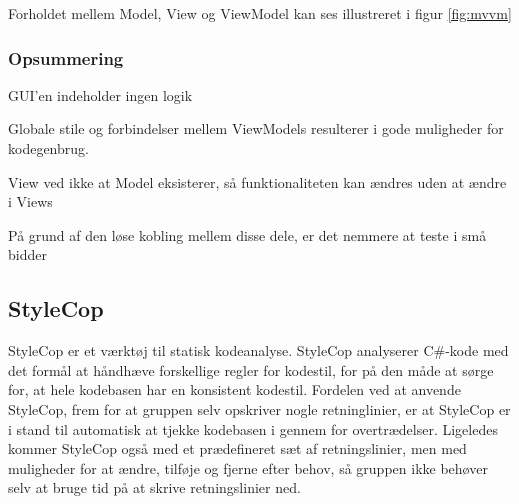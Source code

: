 Forholdet mellem Model, View og ViewModel kan ses illustreret i figur \ref{fig:mvvm}


\subsubsection*{Opsummering}

\begin{itemize_small}
    \item GUI'en indeholder ingen logik
    \item Globale stile og forbindelser mellem ViewModels resulterer i gode muligheder for kodegenbrug.
    \item View ved ikke at Model eksisterer, så funktionaliteten kan ændres uden at ændre i Views
    \item På grund af den løse kobling mellem disse dele, er det nemmere at teste i små bidder
\end{itemize_small}


\subsection*{StyleCop}
StyleCop\cite{StyleCop} er et værktøj til statisk kodeanalyse. StyleCop analyserer C\#-kode med det formål at håndhæve forskellige regler for kodestil, for på den måde at sørge for, at hele kodebasen har en konsistent kodestil. Fordelen ved at anvende StyleCop, frem for at gruppen selv opskriver nogle retninglinier, er at StyleCop er i stand til automatisk at tjekke kodebasen i gennem for overtrædelser. Ligeledes kommer StyleCop også med et prædefineret sæt af retningslinier, men med muligheder for at ændre, tilføje og fjerne efter behov, så gruppen ikke behøver selv at bruge tid på at skrive retningslinier ned.\\


